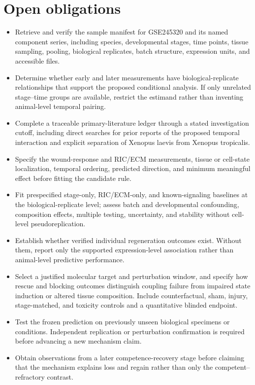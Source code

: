 \documentclass[11pt]{article}
\begin{document}
\section{Open obligations}
\begin{itemize}
\item Retrieve and verify the sample manifest for GSE245320 and its named component series, including species, developmental stages, time points, tissue sampling, pooling, biological replicates, batch structure, expression units, and accessible files.
\item Determine whether early and later measurements have biological-replicate relationships that support the proposed conditional analysis. If only unrelated stage–time groups are available, restrict the estimand rather than inventing animal-level temporal pairing.
\item Complete a traceable primary-literature ledger through a stated investigation cutoff, including direct searches for prior reports of the proposed temporal interaction and explicit separation of Xenopus laevis from Xenopus tropicalis.
\item Specify the wound-response and RIC/ECM measurements, tissue or cell-state localization, temporal ordering, predicted direction, and minimum meaningful effect before fitting the candidate rule.
\item Fit prespecified stage-only, RIC/ECM-only, and known-signaling baselines at the biological-replicate level; assess batch and developmental confounding, composition effects, multiple testing, uncertainty, and stability without cell-level pseudoreplication.
\item Establish whether verified individual regeneration outcomes exist. Without them, report only the supported expression-level association rather than animal-level predictive performance.
\item Select a justified molecular target and perturbation window, and specify how rescue and blocking outcomes distinguish coupling failure from impaired state induction or altered tissue composition. Include counterfactual, sham, injury, stage-matched, and toxicity controls and a quantitative blinded endpoint.
\item Test the frozen prediction on previously unseen biological specimens or conditions. Independent replication or perturbation confirmation is required before advancing a new mechanism claim.
\item Obtain observations from a later competence-recovery stage before claiming that the mechanism explains loss and regain rather than only the competent–refractory contrast.
\end{itemize}
\end{document}
